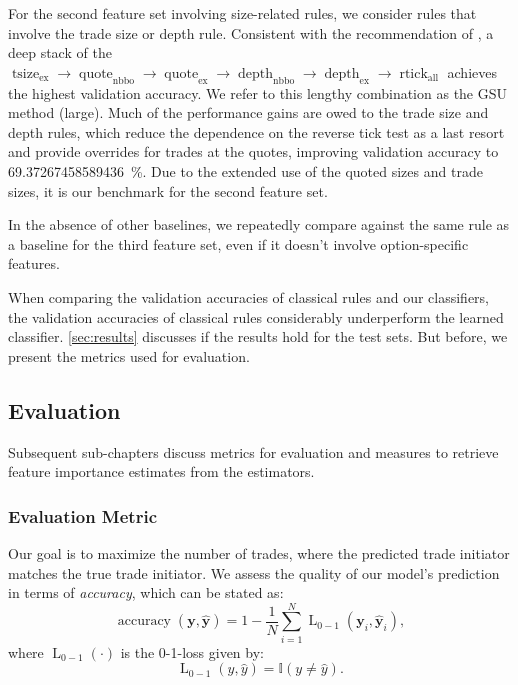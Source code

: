 For the second feature set involving size-related rules, we consider rules that involve the trade size or depth rule. Consistent with the recommendation of \textcite[][15]{grauerOptionTradeClassification2022}, a deep stack of the $\operatorname{tsize}_{\mathrm{ex}} \to \operatorname{quote}_{\mathrm{nbbo}} \to \operatorname{quote}_{\mathrm{ex}} \to \operatorname{depth}_{\mathrm{nbbo}} \to \operatorname{depth}_{\mathrm{ex}} \to \operatorname{rtick}_{\mathrm{all}}$ achieves the highest validation accuracy. We refer to this lengthy combination as the \gls{GSU} method (large). Much of the performance gains are owed to the trade size and depth rules, which reduce the dependence on the reverse tick test as a last resort and provide overrides for trades at the quotes, improving validation accuracy to \SI{69.37267458589436}{\percent}. Due to the extended use of the quoted sizes and trade sizes, it is our benchmark for the second feature set.

In the absence of other baselines, we repeatedly compare against the same rule as a baseline for the third feature set, even if it doesn't involve option-specific features.

When comparing the validation accuracies of classical rules and our classifiers, the validation accuracies of classical rules considerably underperform the learned classifier. \cref{sec:results} discusses if the results hold for the test sets. But before, we present the metrics used
for evaluation.

\subsection{Evaluation}\label{sec:evaluation}

Subsequent sub-chapters discuss metrics for evaluation and measures to retrieve feature importance estimates from the estimators.

\subsubsection{Evaluation Metric}\label{sec:evaluation-metric}

Our goal is to maximize the number of trades, where the predicted trade initiator matches the true trade initiator. We assess the quality of our model’s prediction in terms of \emph{accuracy}, which can be stated as:
\begin{equation}
    \operatorname{accuracy}(\mathbf{y}, \widehat{\mathbf{y}}) = 1 - \frac{1}{N}\sum_{i=1}^{N} \operatorname{L}_{\mathrm{0-1}}(\mathbf{y}_i, \widehat{\mathbf{y}}_i),
\end{equation}
where $\operatorname{L}_{\mathrm{0-1}}(\cdot)$ is the 0-1-loss given by:
\begin{equation}
    \operatorname{L}_{\mathrm{0-1}}(y, \hat{y}) = \mathbb{I}\left(y\neq \hat{y}\right).
    \label{eq:0-1-loss}
\end{equation}

